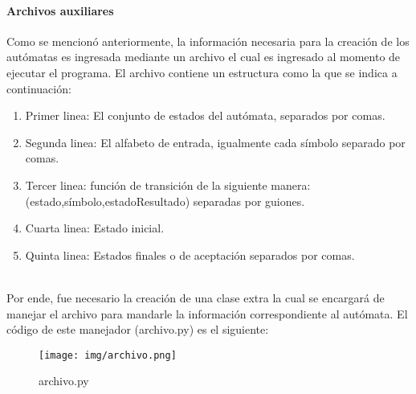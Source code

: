 	\paragraph{Archivos auxiliares}
	Como se mencionó anteriormente, la información necesaria para la creación de los autómatas es ingresada mediante un archivo el cual es ingresado al momento de ejecutar el programa. El archivo contiene un estructura como la que se indica a continuación:
	\begin{enumerate}
		\item Primer linea: El conjunto de estados del autómata, separados por comas.
		\item Segunda linea: El alfabeto de entrada, igualmente cada símbolo separado por comas.
		\item Tercer linea: función de transición de la siguiente manera: (estado,símbolo,estadoResultado) separadas por guiones.
		\item Cuarta linea: Estado inicial.
		\item Quinta linea: Estados finales o de aceptación separados por comas.
	\end{enumerate}\\
	Por ende, fue necesario la creación de una clase extra la cual se encargará de manejar el archivo para mandarle la información correspondiente al autómata. El código de este manejador (archivo.py) es el siguiente:
	\begin{figure}[H]
		\begin{center}
			\texttt{[image: img/archivo.png]}
			\caption{archivo.py}
			\label{fig:tablas}
		\end{center}
	\end{figure}
